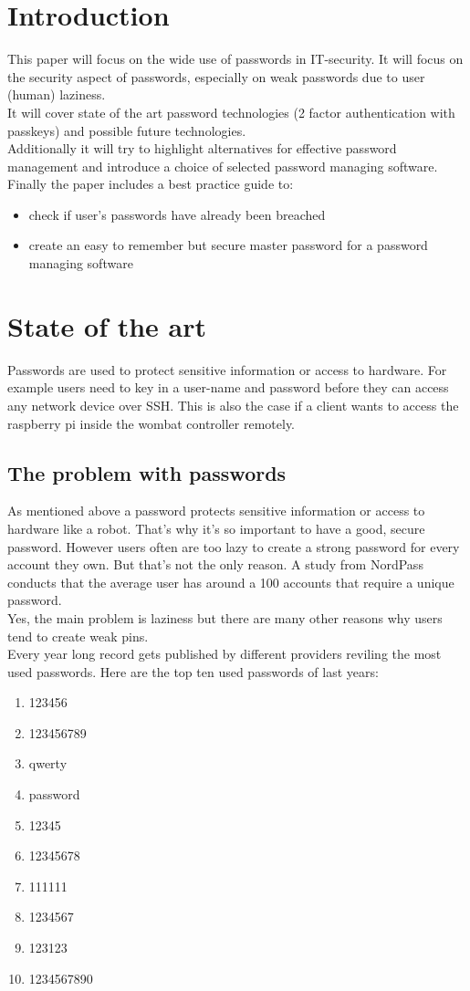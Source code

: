 \documentclass[conference]{IEEEtran}
\begin{document}
\section{Introduction}
This paper will focus on the wide use of passwords in IT-security. It will focus on the security aspect of passwords, especially on weak passwords due to user (human) laziness. \\
It will cover state of the art password technologies (2 factor authentication with passkeys) and possible future technologies.\\
Additionally it will try to highlight alternatives for effective password management and introduce a choice of selected password managing software. \\
Finally the paper includes a best practice guide to:
\begin{itemize}
\item check if user's passwords have already been breached 
\item create an easy to remember but secure master password for a password managing software
\end{itemize} 


\section{State of the art}
Passwords are used to protect sensitive information or access to hardware. For example users need to key in a user-name and password before they can access any network device over SSH. This is also the case if a client wants to access the raspberry pi inside the wombat controller remotely. 

\subsection{The problem with passwords}
As mentioned above a password protects sensitive information or access to hardware like a robot. That's why it's so important to have a good, secure password. However users often are too lazy to create a strong password for every account they own. But that's not the only reason. A study from NordPass conducts that the average user has around a 100 accounts that require a unique password. \\
Yes, the main problem is laziness but there are many other reasons why users tend to create weak pins.\\
Every year long record gets published by different providers reviling the most used passwords. Here are the top ten used passwords of last years:
\vspace{0.5cm}
\begin{enumerate}
\item 123456
\item 123456789
\item qwerty
\item password
\item 12345
\item 12345678
\item 111111
\item 1234567
\item 123123
\item 1234567890
\end{enumerate}
\end{document}
